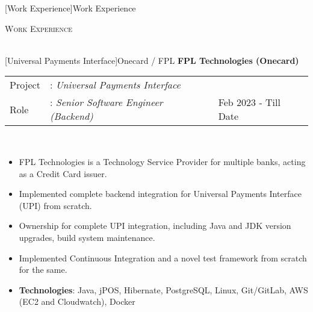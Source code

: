 \documentclass[a4paper]{article}
\newcommand{\lineunder} {
    \vspace*{-8pt} \\
    \hspace*{-18pt} \hrulefill \\
}
\newcommand{\header} [1] {
    {\hspace*{-18pt}\vspace*{6pt} \textsc{#1}}
    \vspace*{-6pt} \lineunder
}
\begin{document}
[Work Experience]{Work Experience}
\header{Work Experience}
\vspace{1mm}

[Universal Payments Interface]{Onecard / FPL}
\textbf{FPL Technologies (Onecard)} \\
\noindent
\begin{tabularx}{\textwidth}{ l l>{\raggedleft\arraybackslash}X}
  Project & : \textit{Universal Payments Interface} & \\
  Role & : \textit{Senior Software Engineer (Backend)}  & Feb 2023 - Till Date \\
\end{tabularx}
\textbf{} \\
\begin{itemize} \itemsep 1pt
  \item FPL Technologies is a Technology Service Provider for multiple banks, acting as a Credit Card issuer.
  \item Implemented complete backend integration for Universal Payments Interface (UPI) from scratch.
  \item Ownership for complete UPI integration, including Java and JDK version upgrades, build system maintenance.
  \item Implemented Continuous Integration and a novel test framework from scratch for the same.
  \item \textbf{Technologies}: Java, jPOS, Hibernate, PostgreSQL, Linux, Git/GitLab, AWS (EC2 and Cloudwatch), Docker
\end{itemize}
\end{document}
